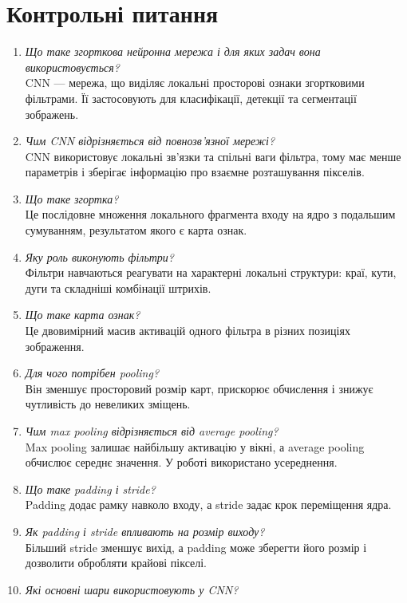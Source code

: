 \documentclass[12pt,a4paper]{article}
\begin{document}
\section{Контрольні питання}
\begin{enumerate}[leftmargin=*]
\item \textit{Що таке згорткова нейронна мережа і для яких задач вона використовується?}\\
CNN --- мережа, що виділяє локальні просторові ознаки згортковими фільтрами. Її застосовують для класифікації, детекції та сегментації зображень.
\item \textit{Чим CNN відрізняється від повнозв'язної мережі?}\\
CNN використовує локальні зв'язки та спільні ваги фільтра, тому має менше параметрів і зберігає інформацію про взаємне розташування пікселів.
\item \textit{Що таке згортка?}\\
Це послідовне множення локального фрагмента входу на ядро з подальшим сумуванням, результатом якого є карта ознак.
\item \textit{Яку роль виконують фільтри?}\\
Фільтри навчаються реагувати на характерні локальні структури: краї, кути, дуги та складніші комбінації штрихів.
\item \textit{Що таке карта ознак?}\\
Це двовимірний масив активацій одного фільтра в різних позиціях зображення.
\item \textit{Для чого потрібен pooling?}\\
Він зменшує просторовий розмір карт, прискорює обчислення і знижує чутливість до невеликих зміщень.
\item \textit{Чим max pooling відрізняється від average pooling?}\\
Max pooling залишає найбільшу активацію у вікні, а average pooling обчислює середнє значення. У роботі використано усереднення.
\item \textit{Що таке padding і stride?}\\
Padding додає рамку навколо входу, а stride задає крок переміщення ядра.
\item \textit{Як padding і stride впливають на розмір виходу?}\\
Більший stride зменшує вихід, а padding може зберегти його розмір і дозволити обробляти крайові пікселі.
\item \textit{Які основні шари використовують у CNN?}\\

\end{enumerate}
\end{document}
